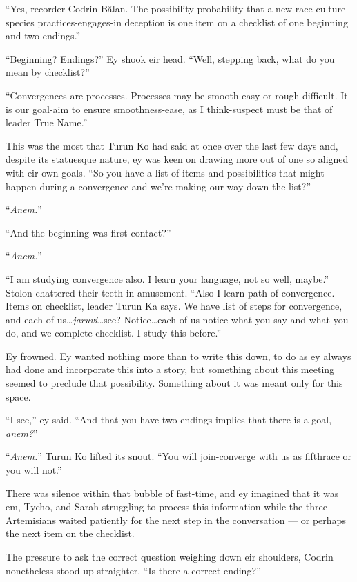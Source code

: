 ``Yes, recorder Codrin Bălan. The possibility-probability that a new race-culture-species practices-engages-in deception is one item on a checklist of one beginning and two endings.''

``Beginning? Endings?'' Ey shook eir head. ``Well, stepping back, what do you mean by checklist?''

``Convergences are processes. Processes may be smooth-easy or rough-difficult. It is our goal-aim to ensure smoothness-ease, as I think-suspect must be that of leader True Name.''

This was the most that Turun Ko had said at once over the last few days and, despite its statuesque nature, ey was keen on drawing more out of one so aligned with eir own goals. ``So you have a list of items and possibilities that might happen during a convergence and we're making our way down the list?''

``\emph{Anem.}''

``And the beginning was first contact?''

``\emph{Anem.}''

``I am studying convergence also. I learn your language, not so well, maybe.'' Stolon chattered their teeth in amusement. ``Also I learn path of convergence. Items on checklist, leader Turun Ka says. We have list of steps for convergence, and each of us\ldots{}\emph{jaruvi}\ldots see? Notice\ldots each of us notice what you say and what you do, and we complete checklist. I study this before.''

Ey frowned. Ey wanted nothing more than to write this down, to do as ey always had done and incorporate this into a story, but something about this meeting seemed to preclude that possibility. Something about it was meant only for this space.

``I see,'' ey said. ``And that you have two endings implies that there is a goal, \emph{anem?}''

``\emph{Anem.}'' Turun Ko lifted its snout. ``You will join-converge with us as fifthrace or you will not.''

There was silence within that bubble of fast-time, and ey imagined that it was em, Tycho, and Sarah struggling to process this information while the three Artemisians waited patiently for the next step in the conversation — or perhaps the next item on the checklist.

The pressure to ask the correct question weighing down eir shoulders, Codrin nonetheless stood up straighter. ``Is there a correct ending?''

